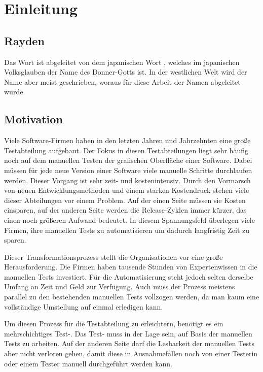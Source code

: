\chapter{Einleitung}
\label{cha:Einleitung}

\section{Rayden}

Das Wort  ist abgeleitet von dem japanischen Wort , welches im japanischen Volksglauben der Name des Donner-Gotts ist. In der westlichen Welt wird der Name aber meist  geschrieben, woraus für diese Arbeit der Namen  abgeleitet wurde.


\section{Motivation}

Viele Software-Firmen haben in den letzten Jahren und Jahrzehnten eine große Testabteilung aufgebaut. Der Fokus in diesen Testabteilungen liegt sehr häufig noch auf dem manuellen Testen der grafischen Oberfläche einer Software. Dabei müssen für jede neue Version einer Software viele manuelle Schritte durchlaufen werden. Dieser Vorgang ist sehr zeit- und kostenintensiv. Durch den Vormarsch von neuen Entwicklungsmethoden und einem starken Kostendruck stehen viele dieser Abteilungen vor einem Problem. Auf der einen Seite müssen sie Kosten einsparen, auf der anderen Seite werden die Release-Zyklen immer kürzer, das einen noch größeren Aufwand bedeutet. In diesem Spannungsfeld überlegen viele Firmen, ihre manuellen Tests zu automatisieren um dadurch langfristig Zeit zu sparen. 

\SuperPar
Dieser Transformationsprozess stellt die Organisationen vor eine große Herausforderung. Die Firmen haben tausende Stunden von Expertenwissen in die manuellen Tests investiert. Für die Automatisierung steht jedoch selten derselbe Umfang an Zeit und Geld zur Verfügung. Auch muss der Prozess meistens parallel zu den bestehenden manuellen Tests vollzogen werden, da man kaum eine vollständige Umstellung auf einmal erledigen kann.

\SuperPar
Um diesen Prozess für die Testabteilung zu erleichtern, benötigt es ein mehrschichtiges Test-. Das Test- muss in der Lage sein, auf Basis der manuellen Tests zu arbeiten. Auf der anderen Seite darf die Lesbarkeit der manuellen Tests aber nicht verloren gehen, damit diese in Ausnahmefällen noch von einer Testerin oder einem Tester manuell durchgeführt werden kann.

